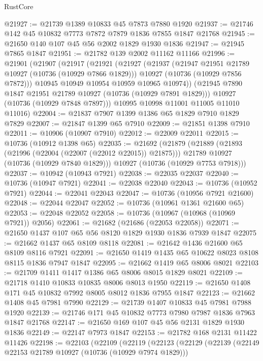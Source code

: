 \begin{lexlean}{RustCore}
\begin{coremodule}
@21927 := @21739 @1389 @10833 @45 @7873 @7880 @1920
@21937 := @21746 @142 @45 @10832 @7773 @7872 @7879 @1836 @7855 @1847 @21768
@21945 := @21650 @140 @107 @45 @56 @2002 @1829 @1930 @1836
@21947 := @21945 @7865 @1847
@21951 := @21782 @139 @2002 @11162 @11166
@21996 := @21901
    (@21907
      (@21917
        (@21921
          (@21927
            (@21937
              (@21947 @21951 @21789 @10927 (@10736 (@10929 @7866 @1829)))
              @10927
              (@10736 (@10929 @7856 @7872)))
            @10945
            @10949
            @10954
            @10959
            @10965
            @10974))
        (@21945 @7890 @1847 @21951 @21789 @10927 (@10736 (@10929 @7891 @1829)))
        @10927
        (@10736 (@10929 @7848 @7897)))
      @10995
      @10998
      @11001
      @11005
      @11010
      @11016)
@22004 := @21837 @7907 @1399 @1386 @65 @1829 @7910 @1829 @7829
@22007 := @21847 @1399 @65 @7910
@22009 := @21851 @1398 @7910
@22011 := @10906 (@10907 @7910)
@22012 := @22009 @22011
@22015 := @10736 (@10912 @1398 @65)
@22035 := @21692
    (@21879
      (@21889
        (@21893 (@21996 (@22004 (@22007 (@22012 @22015)) @21875)))
        @21789
        @10927
        (@10736 (@10929 @7840 @1829)))
      @10927
      (@10736 (@10929 @7753 @7918)))
@22037 := @10942 (@10943 @7921)
@22038 := @22035 @22037
@22040 := @10736 (@10947 @7921)
@22041 := @22038 @22040
@22043 := @10736 (@10952 @7921)
@22044 := @22041 @22043
@22047 := @10736 (@10956 @7921 @21600)
@22048 := @22044 @22047
@22052 := @10736 (@10961 @1361 @21600 @65)
@22053 := @22048 @22052
@22058 := @10736 (@10967 (@10968 (@10969 @7921)) @2056)
@22061 := @21682 (@21686 (@22053 @22058))
@22071 := @21650 @1437 @107 @65 @56 @8120 @1829 @1930 @1836 @7939 @1847
@22075 := @21662 @1437 @65 @8109 @8118
@22081 := @21642 @1436 @21600 @65 @8109 @8116 @7921
@22091 := @21650 @1419 @1435 @65 @10622 @8023 @8108 @8115 @1836 @7947 @1847
@22095 := @21662 @1419 @65 @8006 @8021
@22103 := @21709 @1411 @1417 @1386 @65 @8006 @8015 @1829 @8021
@22109 := @21718 @1410 @10833 @10835 @8006 @8013 @1950
@22119 := @21650 @1408 @171 @45 @10832 @7992 @8005 @8012 @1836 @7955 @1847
@22123 := @21662 @1408 @45 @7981 @7990
@22129 := @21739 @1407 @10833 @45 @7981 @7988 @1920
@22139 := @21746 @171 @45 @10832 @7773 @7980 @7987 @1836 @7963 @1847 @21768
@22147 := @21650 @169 @107 @45 @56 @2131 @1829 @1930 @1836
@22149 := @22147 @7973 @1847
@22153 := @21782 @168 @2131 @11422 @11426
@22198 := @22103
    (@22109
      (@22119
        (@22123
          (@22129
            (@22139
              (@22149 @22153 @21789 @10927 (@10736 (@10929 @7974 @1829)))

\end{coremodule}
\end{lexlean}
